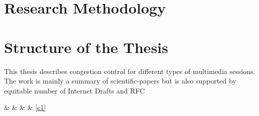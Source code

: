

\section{Research Methodology}

\section{Structure of the Thesis}

This thesis describes congestion control for different types of multimedia
sessions. The work is mainly a summary of scientific-papers but is also 
supported by equitable number of Internet Drafts and RFC




 \&  \&   \& \pageref{c1} \& \ref{c1} 




